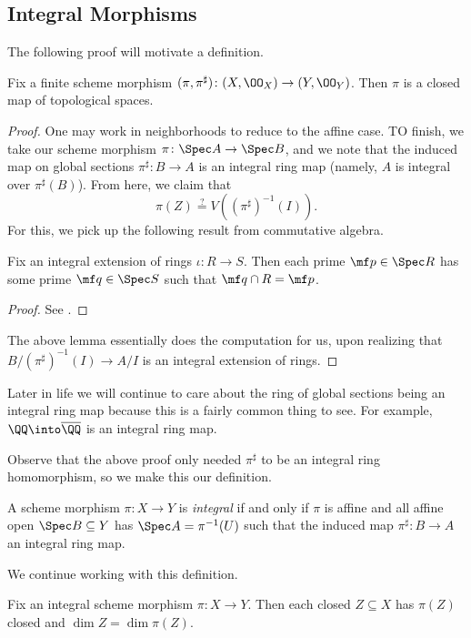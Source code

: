 \documentclass[../notes.tex]{subfiles}
\begin{document}
\subsection{Integral Morphisms}
The following proof will motivate a definition.
\begin{lemma}
	Fix a finite scheme morphism $(\pi,\pi^\sharp)\colon (X,\OO_X)\to (Y,\OO_Y)$. Then $\pi$ is a closed map of topological spaces.
\end{lemma}
\begin{proof}
	One may work in neighborhoods to reduce to the affine case. TO finish, we take our scheme morphism $\pi\colon\Spec A\to\Spec B$, and we note that the induced map on global sections $\pi^\sharp\colon B\to A$ is an integral ring map (namely, $A$ is integral over $\pi^\sharp(B)$). From here, we claim that
	\[\pi(Z)\stackrel?=V\left((\pi^\sharp)^{-1}(I)\right).\]
	For this, we pick up the following result from commutative algebra.
	\begin{lemma}
		Fix an integral extension of rings $\iota\colon R\to S$. Then each prime $\mf p\in\Spec R$ has some prime $\mf q\in\Spec S$ such that $\mf q\cap R=\mf p$.
	\end{lemma}
	\begin{proof}
		See \cite[\S4.4]{eisenbud-comm-alg}.
	\end{proof}
	The above lemma essentially does the computation for us, upon realizing that $B/(\pi^\sharp)^{-1}(I)\to A/I$ is an integral extension of rings.
\end{proof}
\begin{remark}
	Later in life we will continue to care about the ring of global sections being an integral ring map because this is a fairly common thing to see. For example, $\QQ\into\overline\QQ$ is an integral ring map.
\end{remark}
Observe that the above proof only needed $\pi^\sharp$ to be an integral ring homomorphism, so we make this our definition.
\begin{definition}
	A scheme morphism $\pi\colon X\to Y$ is \textit{integral} if and only if $\pi$ is affine and all affine open $\Spec B\subseteq Y$ has $\Spec A=\pi^{-1}(U)$ such that the induced map $\pi^\sharp\colon B\to A$ an integral ring map.
\end{definition}
We continue working with this definition.
\begin{prop}
	Fix an integral scheme morphism $\pi\colon X\to Y$. Then each closed $Z\subseteq X$ has $\pi(Z)$ closed and $\dim Z=\dim\pi(Z)$.
\end{prop}
\end{document}
